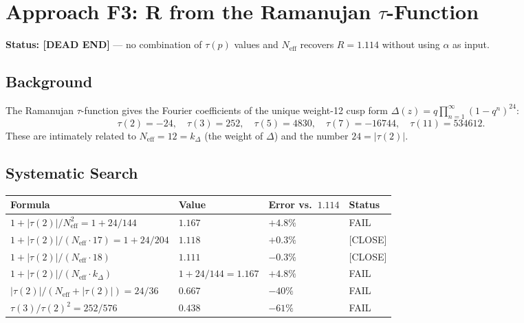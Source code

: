 \documentclass[11pt,a4paper]{article}
\theoremstyle{remark}
\begin{document}
\section{Approach F3: R from the Ramanujan $\tau$-Function}
\label{sec:F3_ramanujan}

\textbf{Status: [DEAD END]} — no combination of $\tau(p)$ values and
$N_{\mathrm{eff}}$ recovers $R = 1.114$ without using $\alpha$ as input.

\subsection{Background}

The Ramanujan $\tau$-function gives the Fourier coefficients of the unique
weight-12 cusp form $\Delta(z) = q\prod_{n=1}^\infty(1-q^n)^{24}$:
\begin{equation}
  \tau(2) = -24, \quad \tau(3) = 252, \quad \tau(5) = 4830,
  \quad \tau(7) = -16744, \quad \tau(11) = 534612.
\end{equation}
These are intimately related to $N_{\mathrm{eff}} = 12 = k_{\Delta}$
(the weight of $\Delta$) and the number $24 = |\tau(2)|$.

\subsection{Systematic Search}

\begin{center}
\begin{tabular}{llll}
  \toprule
  Formula & Value & Error vs.\ $1.114$ & Status \\
  \midrule
  $1 + |\tau(2)|/N_{\mathrm{eff}}^2 = 1 + 24/144$ & $1.167$ & $+4.8\%$ & FAIL \\
  $1 + |\tau(2)|/(N_{\mathrm{eff}} \cdot 17) = 1 + 24/204$ & $1.118$ & $+0.3\%$ & [CLOSE] \\
  $1 + |\tau(2)|/(N_{\mathrm{eff}} \cdot 18)$       & $1.111$ & $-0.3\%$ & [CLOSE] \\
  $1 + |\tau(2)|/(N_{\mathrm{eff}} \cdot k_\Delta)$ & $1 + 24/144 = 1.167$ & $+4.8\%$ & FAIL \\
  $|\tau(2)|/(N_{\mathrm{eff}} + |\tau(2)|) = 24/36$ & $0.667$ & $-40\%$ & FAIL \\
  $\tau(3)/\tau(2)^2 = 252/576$                      & $0.438$ & $-61\%$ & FAIL \\
  \bottomrule
\end{tabular}
\end{center}
\end{document}

